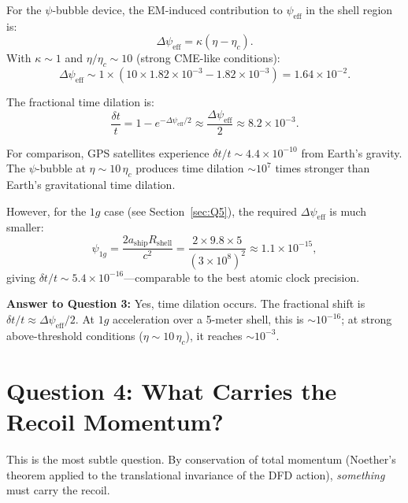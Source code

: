 \documentclass[12pt, letterpaper]{article}
\theoremstyle{definition}
\theoremstyle{remark}
\newcommand{\etac}{\eta_c}
\begin{document}
For the $\psi$-bubble device, the EM-induced contribution to $\psi_{\mathrm{eff}}$
in the shell region is:
\begin{equation}
\Delta\psi_{\mathrm{eff}} = \kappa(\eta - \etac).
\end{equation}
With $\kappa \sim 1$ and $\eta/\etac \sim 10$ (strong CME-like conditions):
\begin{equation}
\Delta\psi_{\mathrm{eff}} \sim 1 \times (10 \times 1.82 \times 10^{-3} - 1.82 \times 10^{-3})
= 1.64 \times 10^{-2}.
\end{equation}

The fractional time dilation is:
\begin{equation}
\frac{\delta t}{t} = 1 - e^{-\Delta\psi_{\mathrm{eff}}/2}
\approx \frac{\Delta\psi_{\mathrm{eff}}}{2}
\approx 8.2 \times 10^{-3}.
\end{equation}

For comparison, GPS satellites experience $\delta t/t \sim 4.4 \times 10^{-10}$
from Earth's gravity. The $\psi$-bubble at $\eta \sim 10\,\etac$ produces
time dilation $\sim 10^7$ times stronger than Earth's gravitational time
dilation.

However, for the $1g$ case (see Section~\ref{sec:Q5}), the required
$\Delta\psi_{\mathrm{eff}}$ is much smaller:
\begin{equation}
\psi_{1g} = \frac{2 a_{\mathrm{ship}} R_{\mathrm{shell}}}{c^2}
= \frac{2 \times 9.8 \times 5}{(3 \times 10^8)^2}
\approx 1.1 \times 10^{-15},
\end{equation}
giving $\delta t/t \sim 5.4 \times 10^{-16}$---comparable to the best atomic
clock precision.

\textbf{Answer to Question 3:} Yes, time dilation occurs. The fractional
shift is $\delta t/t \approx \Delta\psi_{\mathrm{eff}}/2$. At $1g$
acceleration over a 5-meter shell, this is $\sim 10^{-16}$; at strong
above-threshold conditions ($\eta \sim 10\,\etac$), it reaches $\sim 10^{-3}$.

\section{Question 4: What Carries the Recoil Momentum?}
\label{sec:Q4}

This is the most subtle question. By conservation of total momentum
(Noether's theorem applied to the translational invariance of the DFD action),
\emph{something} must carry the recoil.
\end{document}
